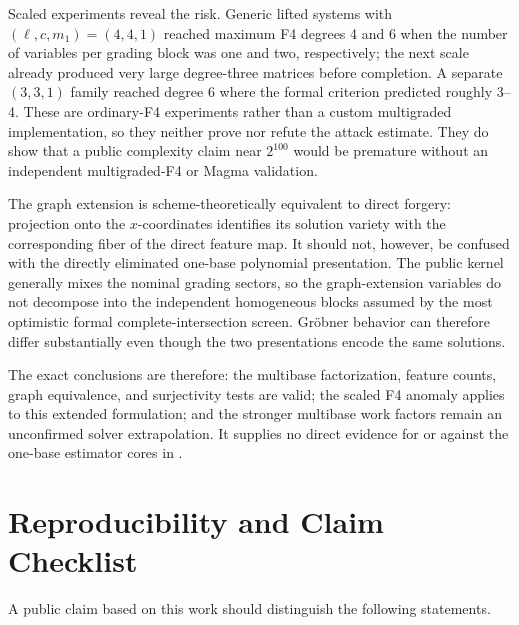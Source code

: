 \documentclass[11pt]{article}
\begin{document}
Scaled experiments reveal the risk.  Generic lifted systems with
$(\ell,c,m_1)=(4,4,1)$ reached maximum F4 degrees 4 and 6 when the number of
variables per grading block was one and two, respectively; the next scale
already produced very large degree-three matrices before completion.  A
separate $(3,3,1)$ family reached degree 6 where the formal criterion predicted
roughly 3--4.  These are ordinary-F4 experiments rather than a custom
multigraded implementation, so they neither prove nor refute the attack
estimate.  They do show that a public complexity claim near $2^{100}$ would be
premature without an independent multigraded-F4 or Magma validation.

The graph extension is scheme-theoretically equivalent to direct forgery:
projection onto the $x$-coordinates identifies its solution variety with the
corresponding fiber of the direct feature map.  It should not, however, be
confused with the directly eliminated one-base polynomial presentation.  The
public kernel generally mixes the nominal grading sectors, so the graph-extension
variables do not decompose into the independent homogeneous blocks assumed by the
most optimistic formal complete-intersection screen.  Gr\"obner behavior can
therefore differ substantially even though the two presentations encode the same
solutions.

The exact conclusions are therefore: the multibase factorization, feature counts,
graph equivalence, and surjectivity tests are valid; the scaled F4 anomaly applies
to this extended formulation; and the stronger multibase work factors remain an
unconfirmed solver extrapolation.  It supplies no direct evidence for or against
the one-base estimator cores in .

\section{Reproducibility and Claim Checklist}\label{app:repro}

A public claim based on this work should distinguish the following statements.
\end{document}
